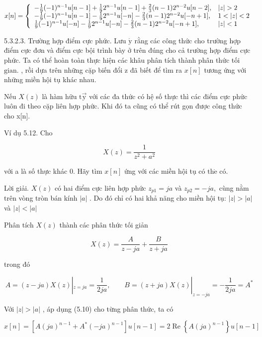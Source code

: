 \documentclass[
  10
]{article}
\begin{document}
\[
x [ n ] = \left\{ \begin{array}{l l} - \frac {1}{9} (- 1) ^ {n - 1} u [ n - 1 ] + \frac {1}{9} 2 ^ {n - 1} u [ n - 1 ] + \frac {2}{3} (n - 1) 2 ^ {n - 2} u [ n - 2 ], & | z | > 2 \\ - \frac {1}{9} (- 1) ^ {n - 1} u [ n - 1 ] - \frac {1}{9} 2 ^ {n - 1} u [ - n ] - \frac {2}{3} (n - 1) 2 ^ {n - 2} u [ - n + 1 ], & 1 <   | z | <   2 \\ \frac {1}{9} (- 1) ^ {n - 1} u [ - n ] - \frac {1}{9} 2 ^ {n - 1} u [ - n ] - \frac {2}{3} (n - 1) 2 ^ {n - 2} u [ - n + 1 ], & | z | <   1 \end{array} \right.
\]

5.3.2.3. Trường hợp điểm cực phức. Lưu \(\acute { \mathrm { y } }\) rằng
các công thức cho trường hợp điểm cực đơn và điểm cực bội trình bày ở
trên đúng cho cả trường hợp điểm cực phức. Ta có thể hoàn toàn thực hiện
các khâu phân tích thành phân thức tối \(\mathrm { { g i a n } . }\) ,
rồi dựa trên những cặp biến đổi z đã biết để tìm ra \(x [ n ]\) tương
ứng với những miền hội tụ khác nhau.

Nếu \(X ( z )\) là hàm hữu \(\mathrm { t \vec { y } }\) với các đa thức
có hệ số thực thì các điểm cực phức luôn đi theo cặp liên hợp phức. Khi
đó ta cũng có thể rút gọn được công thức cho x{[}n{]}.

Ví dụ 5.12. Cho

\[
X (z) = \frac {1}{z ^ {2} + a ^ {2}}
\]

với a là số thực khác 0. Hãy tìm \(x [ n ]\) ứng với các miền hội tụ có
\(\mathrm { t h } \mathring { \mathrm { e } }\) có.

Lời giải. \(X ( z )\) có hai điểm cực liên hợp phức
\(z _ { p 1 } = j a\) và \(z _ { p 2 } = - j a ,\) cùng nằm trên vòng
tròn bán kính \(| a |\) . Do đó chỉ có hai khả năng cho miền hội tụ:
\(| z | > | a |\) và \(| z | < | a |\)

Phân tích \(X ( z )\) thành các phân thức tối giản

\[
X (z) = \frac {A}{z - j a} + \frac {B}{z + j a}
\]

trong đó

\[
A = (z - j a) X (z) | _ {z = j a} = \frac {1}{2 j a}, \qquad B = (z + j a) X (z) | _ {z = - j a} = - \frac {1}{2 j a} = A ^ {*}
\]

Với \(| z | > | a |\) , áp dụng (5.10) cho từng phân thức, ta có

\[
x [ n ] = \left[ A (j a) ^ {n - 1} + A ^ {*} (- j a) ^ {n - 1} \right] u [ n - 1 ] = 2 \operatorname{Re} \left\{A (j a) ^ {n - 1} \right\} u [ n - 1 ]
\]
\end{document}
